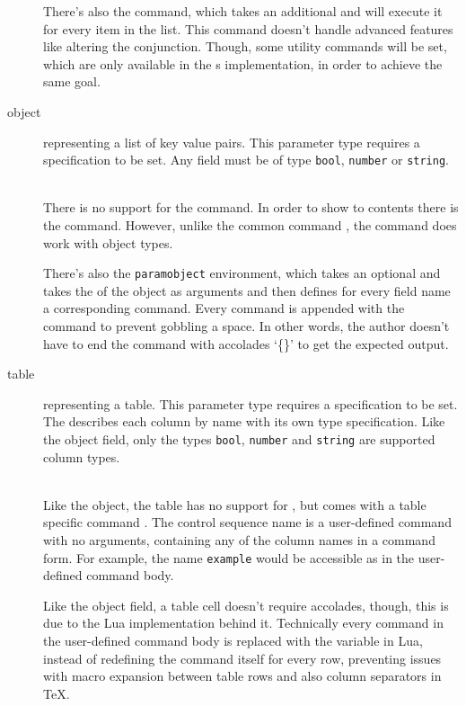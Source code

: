 \documentclass{ltxdoc}
\newcommand\showexample[5][15pt]{%
\begin{minipage}[t]{.5\linewidth - .5 \columnsep}%

\end{minipage}\hspace*{\columnsep}%
\begin{minipage}[t]{.5\linewidth - .5 \columnsep}%

\end{minipage}\\%
}
\begin{document}
\begin{description}
        \DescribeMacro{\forlistitem}
        There's also the \cmd{\forlistitem} command, which takes an additional  and will execute it for every item in the list.
        This command doesn't handle advanced features like altering the conjunction.
        Though, some utility commands will be set, which are only available in the s implementation, in order to achieve the same goal.
        \item[object] representing a list of key value pairs.
        This parameter type requires a  specification to be set.
        Any field must be of type \texttt{bool}, \texttt{number} or \texttt{string}.\\
        \showexample{16}{16-24}{7}{7-9}
        There is no support for the \cmd{\param} command.
        \DescribeMacro{\paramfield}
        In order to show to contents there is the \cmd{\paramfield} command.
        However, unlike the common command \cmd{\param}, the command \cmd{\hasparam} does work with object types.

         There's also the \texttt{paramobject} environment, which takes an optional  and takes the  of the object as arguments and then defines for every field name a corresponding command.
        Every command is appended with the \cmd{\xspace} command to prevent gobbling a space.
        In other words, the author doesn't have to end the command with accolades `\{\}' to get the expected output.

        \item[table] representing a table.
        This parameter type requires a  specification to be set.
        The  describes each column by name with its own type specification.
        Like the object field, only the types \texttt{bool}, \texttt{number} and \texttt{string} are supported column types.\\
        \showexample[20pt]{25}{25}{10}{10}
        Like the object, the table has no support for \cmd{\param}, but comes with a table specific command \cmd{\fortablerow}.
        The control sequence name  is a user-defined command with no arguments, containing any of the column names in a command form.
        For example, the name \texttt{example} would be accessible as \cmd{\example} in the user-defined command body.

        Like the object field, a table cell doesn't require accolades, though, this is due to the Lua implementation behind it.
        Technically every command in the user-defined command body is replaced with the variable in Lua, instead of redefining the command itself for every row, preventing issues with macro expansion between table rows and also column separators in \TeX{}.

    \end{description}
\end{document}
